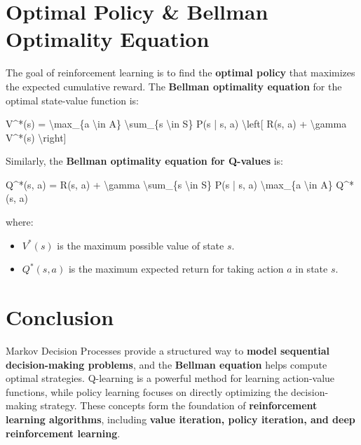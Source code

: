 \documentclass[
]{book}
\newenvironment{Shaded}{\begin{snugshade}}{\end{snugshade}}
\newcommand{\NormalTok}[1]{#1}
\providecommand{\tightlist}{%
  \setlength{\itemsep}{0pt}\setlength{\parskip}{0pt}}
\begin{document}
\section{\texorpdfstring{\textbf{Optimal Policy \& Bellman Optimality Equation}}{Optimal Policy \& Bellman Optimality Equation}}\label{optimal-policy-bellman-optimality-equation}

The goal of reinforcement learning is to find the \textbf{optimal policy} that maximizes the expected cumulative reward. The \textbf{Bellman optimality equation} for the optimal state-value function is:

\begin{Shaded}
\begin{Highlighting}[]
\NormalTok{V\^{}*(s) = \textbackslash{}max\_\{a \textbackslash{}in A\} \textbackslash{}sum\_\{s\textquotesingle{} \textbackslash{}in S\} P(s\textquotesingle{} | s, a) \textbackslash{}left[ R(s, a) + \textbackslash{}gamma V\^{}*(s\textquotesingle{}) \textbackslash{}right]}
\end{Highlighting}
\end{Shaded}

Similarly, the \textbf{Bellman optimality equation for Q-values} is:

\begin{Shaded}
\begin{Highlighting}[]
\NormalTok{Q\^{}*(s, a) = R(s, a) + \textbackslash{}gamma \textbackslash{}sum\_\{s\textquotesingle{} \textbackslash{}in S\} P(s\textquotesingle{} | s, a) \textbackslash{}max\_\{a\textquotesingle{} \textbackslash{}in A\} Q\^{}*(s\textquotesingle{}, a\textquotesingle{})}
\end{Highlighting}
\end{Shaded}

where:

\begin{itemize}
\tightlist
\item
  \(V^*(s)\) is the maximum possible value of state \(s\).
\item
  \(Q^*(s, a)\) is the maximum expected return for taking action \(a\) in state \(s\).
\end{itemize}

\section{\texorpdfstring{\textbf{Conclusion}}{Conclusion}}\label{conclusion-2}

Markov Decision Processes provide a structured way to \textbf{model sequential decision-making problems}, and the \textbf{Bellman equation} helps compute optimal strategies. Q-learning is a powerful method for learning action-value functions, while policy learning focuses on directly optimizing the decision-making strategy. These concepts form the foundation of \textbf{reinforcement learning algorithms}, including \textbf{value iteration, policy iteration, and deep reinforcement learning}.
\end{document}
